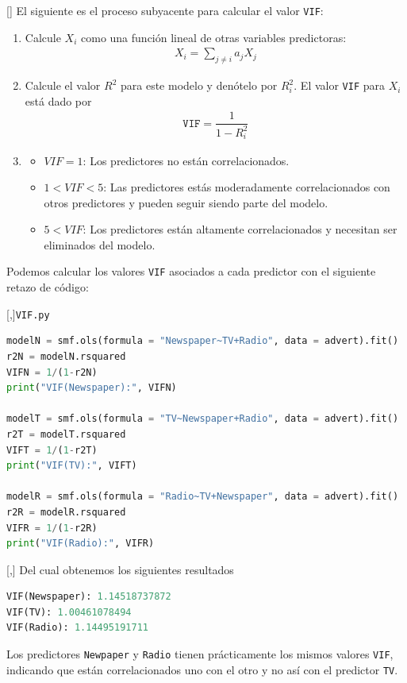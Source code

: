 []{}
El siguiente es el proceso subyacente para calcular el valor \texttt{VIF}:
\begin{enumerate}
 \item Calcule $X_{i}$ como una función lineal de otras variables predictoras:
 \begin{align}
 X_{i}=\sum_{j\neq i}a_{j}X_{j}
\end{align}
\item Calcule el valor $R^{2}$ para este modelo y denótelo por $R^{2}_{i}.$ El valor \texttt{VIF} para $X_{i}$ está dado por
\begin{align}
 \texttt{VIF}= \dfrac{1}{1-R_{i}^{2}}
\end{align} 
\item
\begin{itemize}
 \item $VIF=1$: Los predictores no están correlacionados.
 \item $1<VIF<5$: Las predictores estás moderadamente correlacionados con otros predictores y pueden seguir siendo parte del modelo.
 \item $5<VIF$: Los predictores están altamente correlacionados y necesitan ser eliminados del modelo.
\end{itemize}

\end{enumerate}



Podemos calcular los valores \texttt{VIF} asociados a cada predictor con el siguiente retazo de código:

[,]{\texttt{VIF.py}}
\begin{lstlisting}[language=Python]
modelN = smf.ols(formula = "Newspaper~TV+Radio", data = advert).fit()
r2N = modelN.rsquared
VIFN = 1/(1-r2N)
print("VIF(Newspaper):", VIFN)

modelT = smf.ols(formula = "TV~Newspaper+Radio", data = advert).fit()
r2T = modelT.rsquared
VIFT = 1/(1-r2T)
print("VIF(TV):", VIFT)

modelR = smf.ols(formula = "Radio~TV+Newspaper", data = advert).fit()
r2R = modelR.rsquared
VIFR = 1/(1-r2R)
print("VIF(Radio):", VIFR)
\end{lstlisting}

[,]{}
Del cual obtenemos los siguientes resultados
\begin{lstlisting}[language=Python]
VIF(Newspaper): 1.14518737872
VIF(TV): 1.00461078494
VIF(Radio): 1.14495191711
\end{lstlisting}


Los predictores \texttt{Newpaper} y \texttt{Radio} tienen prácticamente los mismos valores \texttt{VIF}, indicando que están correlacionados uno con el otro y no así con el predictor \texttt{TV}.


